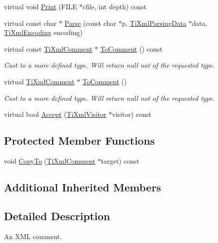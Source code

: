 \begin{DoxyCompactItemize}
virtual void \hyperlink{class_ti_xml_comment_a17398061d62c470f57801ce28fa33ad4}{Print} (F\+I\+L\+E $\ast$cfile, int depth) const 
\item 
virtual const char $\ast$ \hyperlink{class_ti_xml_comment_a43bddc18ac057734b41d84653b71d3e0}{Parse} (const char $\ast$p, \hyperlink{class_ti_xml_parsing_data}{Ti\+Xml\+Parsing\+Data} $\ast$data, \hyperlink{tinyxml_8h_a88d51847a13ee0f4b4d320d03d2c4d96}{Ti\+Xml\+Encoding} encoding)
\item 
virtual const \hyperlink{class_ti_xml_comment}{Ti\+Xml\+Comment} $\ast$ \hyperlink{class_ti_xml_comment_a00fb4215c20a2399ea05ac9b9e7e68a0}{To\+Comment} () const 
\begin{DoxyCompactList}\small\item\em Cast to a more defined type. Will return null not of the requested type. \end{DoxyCompactList}\item 
virtual \hyperlink{class_ti_xml_comment}{Ti\+Xml\+Comment} $\ast$ \hyperlink{class_ti_xml_comment_acc7c7e07e13c23f17797d642981511df}{To\+Comment} ()
\begin{DoxyCompactList}\small\item\em Cast to a more defined type. Will return null not of the requested type. \end{DoxyCompactList}\item 
virtual bool \hyperlink{class_ti_xml_comment_a4382de0e50da973f11a23ea5852568bd}{Accept} (\hyperlink{class_ti_xml_visitor}{Ti\+Xml\+Visitor} $\ast$visitor) const 
\end{DoxyCompactItemize}
\subsection*{Protected Member Functions}
\begin{DoxyCompactItemize}
\item 
void \hyperlink{class_ti_xml_comment_a3175b2f27628f4fb7a043897930cd934}{Copy\+To} (\hyperlink{class_ti_xml_comment}{Ti\+Xml\+Comment} $\ast$target) const 
\end{DoxyCompactItemize}
\subsection*{Additional Inherited Members}


\subsection{Detailed Description}
An X\+M\+L comment. 

